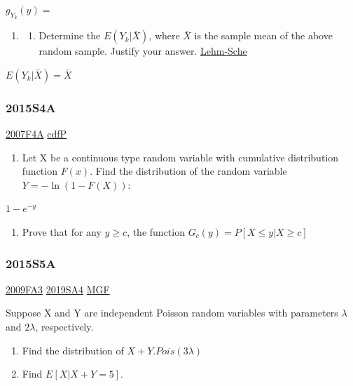 \documentclass[10pt,twocolumn,portrait]{article}
\providecommand{\tightlist}{%
  \setlength{\itemsep}{0pt}\setlength{\parskip}{0pt}}
\begin{document}
\(g_{Y_k}(y)=\)

\begin{enumerate}
\def\labelenumi{(\alph{enumi})}
\setcounter{enumi}{1}
\item
  \begin{enumerate}
  \def\labelenumii{(\arabic{enumii})}
  \setcounter{enumii}{4}
  \tightlist
  \item
    Determine the \(E(Y_k|\bar X)\), where \(\bar X\) is the sample mean
    of the above random sample. Justify your answer.
    \protect\hyperlink{Lehm-Sche}{Lehm-Sche}
  \end{enumerate}
\end{enumerate}

\(E(Y_k|\bar X)=\bar X\)

\hypertarget{s4a-1}{%
\subsubsection{2015S4A}\label{s4a-1}}

\protect\hyperlink{f4a}{2007F4A} \protect\hyperlink{cdfP}{cdfP}

\begin{enumerate}
\def\labelenumi{(\alph{enumi})}
\tightlist
\item
  Let X be a continuous type random variable with cumulative
  distribution function \(F(x)\). Find the distribution of the random
  variable \(Y=-\ln(1-F(X))\):
\end{enumerate}

\(1-e^{-y}\)

\begin{enumerate}
\def\labelenumi{(\alph{enumi})}
\setcounter{enumi}{1}
\tightlist
\item
  Prove that for any \(y\ge c\), the function
  \(G_c(y)=P[X\le y|X\ge c]\)
\end{enumerate}

\hypertarget{s5a-1}{%
\subsubsection{2015S5A}\label{s5a-1}}

\protect\hyperlink{fa3}{2009FA3} \protect\hyperlink{sa4-3}{2019SA4}
\protect\hyperlink{MGF}{MGF}

Suppose X and Y are independent Poisson random variables with parameters
\(\lambda\) and \(2\lambda\), respectively.

\begin{enumerate}
\def\labelenumi{(\alph{enumi})}
\item
  Find the distribution of \(X+Y\).\(Pois(3\lambda)\)
\item
  Find \(E[X|X+Y=5]\).
\end{enumerate}
\end{document}
